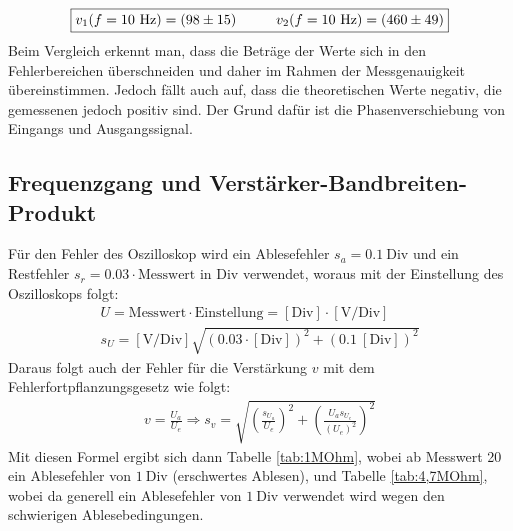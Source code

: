 \begin{gather}
    \boxed{v_1(f=10~\text{Hz})=(98\pm 15) \hspace*{1cm} v_2(f=10~\text{Hz})=(460\pm 49)}
\end{gather}
Beim Vergleich erkennt man, dass die Beträge der Werte sich in den Fehlerbereichen überschneiden und daher im Rahmen der Messgenauigkeit übereinstimmen. Jedoch fällt auch auf, dass die theoretischen Werte negativ, die gemessenen jedoch positiv sind. Der Grund dafür ist die Phasenverschiebung von Eingangs und Ausgangssignal.


\subsection*{Frequenzgang und Verstärker-Bandbreiten-Produkt}
Für den Fehler des Oszilloskop wird ein Ablesefehler $s_a = 0.1~\text{Div}$ und ein Restfehler $s_r = 0.03\cdot\text{Messwert in Div}$ verwendet, woraus mit der Einstellung des Oszilloskops folgt:
\begin{gather}
    U = \text{Messwert}\cdot\text{Einstellung} = [\text{Div}]\cdot[\text{V/Div}]\\
    s_U = [\text{V/Div}]\sqrt{(0.03\cdot [\text{Div}])^2 + (0.1~[\text{Div}])^2} 
\end{gather}
Daraus folgt auch der Fehler für die Verstärkung $v$ mit dem Fehlerfortpflanzungsgesetz wie folgt:
\begin{gather}
    v = \frac{U_a}{U_e} \Rightarrow s_v = \sqrt{\left(\frac{s_{U_a}}{U_e}\right)^2 + \left(\frac{U_a s_{U_e}}{(U_e)^2}\right)^2}
\end{gather}
Mit diesen Formel ergibt sich dann Tabelle \ref{tab:1MOhm}, wobei ab Messwert 20 ein Ablesefehler von $1~\text{Div}$ (erschwertes Ablesen), und Tabelle \ref{tab:4,7MOhm}, wobei da generell ein Ablesefehler von $1~\text{Div}$ verwendet wird wegen den schwierigen Ablesebedingungen.
\newpage

